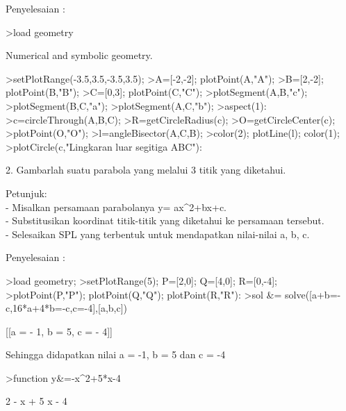 \documentclass[a4paper,10pt]{article}
\begin{document}
\begin{eulernotebook}
\begin{eulercomment}
\begin{eulercomment}
\begin{eulercomment}
\begin{eulercomment}
\begin{eulercomment}
\begin{eulercomment}
\begin{eulercomment}
\begin{eulercomment}
\begin{eulercomment}
\begin{eulercomment}
\begin{eulercomment}
\begin{eulercomment}
\begin{eulercomment}
\begin{eulercomment}
\begin{eulercomment}
\begin{eulercomment}
\begin{eulercomment}
Penyelesaian :
\end{eulercomment}
\begin{eulerprompt}
>load geometry
\end{eulerprompt}
\begin{euleroutput}
  Numerical and symbolic geometry.
\end{euleroutput}
\begin{eulerprompt}
>setPlotRange(-3.5,3.5,-3.5,3.5);
>A=[-2,-2]; plotPoint(A,"A");
>B=[2,-2]; plotPoint(B,"B");
>C=[0,3]; plotPoint(C,"C");
>plotSegment(A,B,"c");
>plotSegment(B,C,"a");
>plotSegment(A,C,"b");
>aspect(1):
>c=circleThrough(A,B,C);
>R=getCircleRadius(c);
>O=getCircleCenter(c);
>plotPoint(O,"O");
>l=angleBisector(A,C,B);
>color(2); plotLine(l); color(1);
>plotCircle(c,"Lingkaran luar segitiga ABC"):
\end{eulerprompt}
\begin{eulercomment}
2. Gambarlah suatu parabola yang melalui 3 titik yang diketahui.

Petunjuk:\\
- Misalkan persamaan parabolanya y= ax\textasciicircum{}2+bx+c.\\
- Substitusikan koordinat titik-titik yang diketahui ke persamaan
tersebut.\\
- Selesaikan SPL yang terbentuk untuk mendapatkan nilai-nilai a, b, c.

Penyelesaian :
\end{eulercomment}
\begin{eulerprompt}
>load geometry;
>setPlotRange(5); P=[2,0]; Q=[4,0]; R=[0,-4];
>plotPoint(P,"P"); plotPoint(Q,"Q"); plotPoint(R,"R"):
>sol &= solve([a+b=-c,16*a+4*b=-c,c=-4],[a,b,c])
\end{eulerprompt}
\begin{euleroutput}
  
                       [[a = - 1, b = 5, c = - 4]]
  
\end{euleroutput}
\begin{eulercomment}
Sehingga didapatkan nilai a = -1, b = 5 dan c = -4
\end{eulercomment}
\begin{eulerprompt}
>function y&=-x^2+5*x-4
\end{eulerprompt}
\begin{euleroutput}
  
                                 2
                              - x  + 5 x - 4
  

\end{euleroutput}
\end{eulercomment}
\end{eulercomment}
\end{eulercomment}
\end{eulercomment}
\end{eulercomment}
\end{eulercomment}
\end{eulercomment}
\end{eulercomment}
\end{eulercomment}
\end{eulercomment}
\end{eulercomment}
\end{eulercomment}
\end{eulercomment}
\end{eulercomment}
\end{eulercomment}
\end{eulercomment}
\end{eulernotebook}
\end{document}
